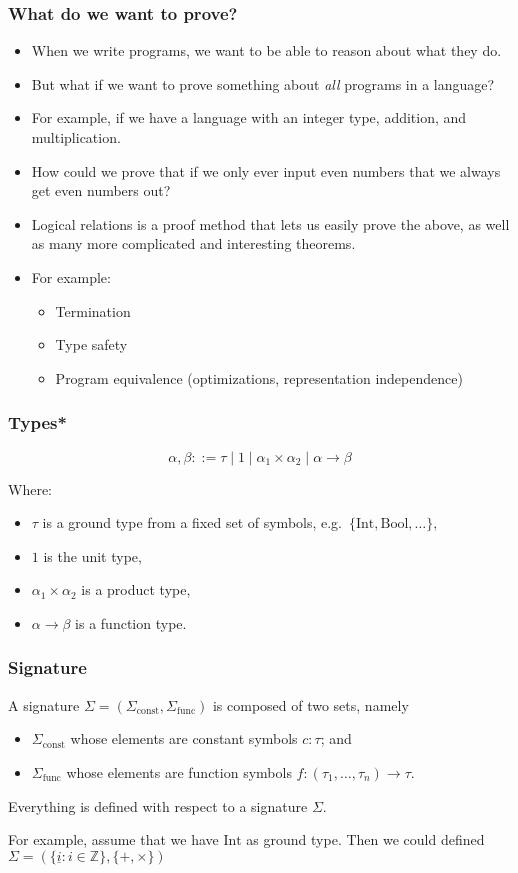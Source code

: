 \documentclass[aspectratio=169]{beamer}
\begin{document}
\begin{frame}
\frametitle{What do we want to prove?}

\begin{itemize}
    \item When we write programs, we want to be able to reason about what they do.
    \pause
    \item But what if we want to prove something about \emph{all} programs in a language?
    \pause
    \item For example, if we have a language with an integer type, addition, and multiplication.
    \pause
    \item How could we prove that if we only ever input even numbers that we always get even numbers out?
    \pause
    \item Logical relations is a proof method that lets us easily prove the above, as well as many more complicated and interesting theorems.
    \pause
    \item For example:
    \begin{itemize}
        \item Termination
        \item Type safety
        \item Program equivalence (optimizations, representation independence)
    \end{itemize}
\end{itemize}
\end{frame}

\begin{frame}
\frametitle{Types*}
\[
\alpha, \beta ::= \tau \mid 1 \mid \alpha_1 \times \alpha_2 \mid \alpha \rightarrow \beta
\]

Where:
\begin{itemize}
    \item $\tau$ is a ground type from a fixed set of symbols, e.g.\ $\{\text{Int}, \text{Bool}, \ldots\},$
    \item $1$ is the unit type,
    \item $\alpha_1 \times \alpha_2$ is a product type,
    \item $\alpha \rightarrow \beta$ is a function type.
\end{itemize}
\end{frame}

\begin{frame}
\frametitle{Signature}
A signature $\Sigma = (\Sigma_{\text{const}}, \Sigma_{\text{func}})$ is composed of two sets, namely
\begin{itemize}
    \item $\Sigma_{\text{const}}$ whose elements are constant symbols $c : \tau$; and
    \item $\Sigma_{\text{func}}$ whose elements are function symbols $f : (\tau_1, \ldots, \tau_n) \to \tau$.
\end{itemize}
Everything is defined with respect to a signature $\Sigma$.

\medskip

For example, assume that we have $\text{Int}$ as ground type.
Then we could defined $\Sigma = \left(\{\underline{i} : i \in \mathbb{Z}\}, \{+, \times\}\right)$ 

\end{frame}
\end{document}
